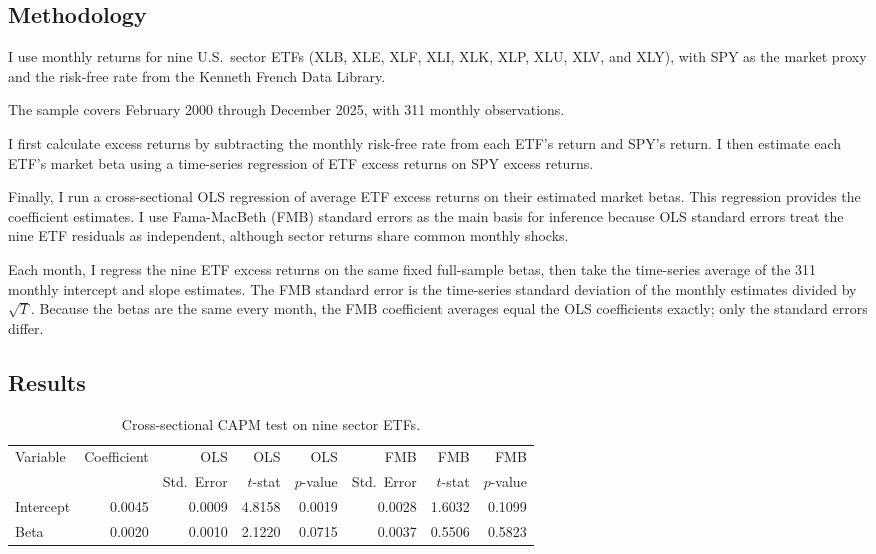 \subsection{Methodology}

I use monthly returns for nine U.S.\ sector ETFs (XLB, XLE, XLF, XLI, XLK, XLP,
XLU, XLV, and XLY), with SPY as the market proxy and the risk-free rate from
the Kenneth French Data Library.

The sample covers February 2000 through December 2025, with 311 monthly
observations.

I first calculate excess returns by subtracting the monthly risk-free rate from
each ETF's return and SPY's return. I then estimate each ETF's market beta
using a time-series regression of ETF excess returns on SPY excess returns.

Finally, I run a cross-sectional OLS regression of average ETF excess returns
on their estimated market betas. This regression provides the coefficient
estimates. I use Fama-MacBeth (FMB) standard errors as the main basis for
inference because OLS standard errors treat the nine ETF residuals as
independent, although sector returns share common monthly shocks.

Each month, I regress the nine ETF excess returns on the same fixed full-sample
betas, then take the time-series average of the 311 monthly intercept and slope
estimates. The FMB standard error is the time-series standard deviation of the
monthly estimates divided by $\sqrt{T}$. Because the betas are the same every
month, the FMB coefficient averages equal the OLS coefficients exactly; only
the standard errors differ.

\subsection{Results}

\begin{table}[H]
\centering
\caption{Cross-sectional CAPM test on nine sector ETFs.}
\small
\begin{tabular}{lrrrrrrr}
\toprule
Variable & Coefficient & OLS & OLS & OLS & FMB & FMB & FMB \\
 & & Std.\ Error & $t$-stat & $p$-value & Std.\ Error & $t$-stat & $p$-value \\
\midrule
Intercept & 0.0045 & 0.0009 & 4.8158 & 0.0019 & 0.0028 & 1.6032 & 0.1099 \\
Beta      & 0.0020 & 0.0010 & 2.1220 & 0.0715 & 0.0037 & 0.5506 & 0.5823 \\
\bottomrule
\end{tabular}
\label{tab:cap}
\end{table}

